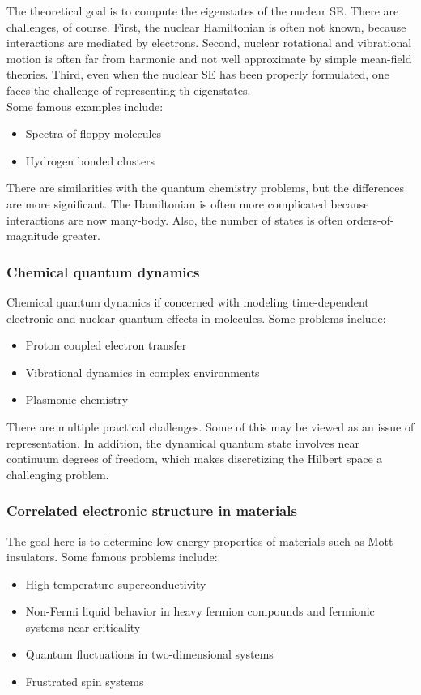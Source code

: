 \documentclass{book}
\theoremstyle{definition}
\begin{document}
The theoretical goal is to compute the eigenstates of the nuclear SE. There are challenges, of course. First, the nuclear Hamiltonian is often not known, because interactions are mediated by electrons. Second, nuclear rotational and vibrational motion is often far from harmonic and not well approximate by simple mean-field theories. Third, even when the nuclear SE has been properly formulated, one faces the challenge of representing th eigenstates. \\

Some famous examples include:
\begin{itemize}
	\item Spectra of floppy molecules
	\item Hydrogen bonded clusters
\end{itemize}

There are similarities with the quantum chemistry problems, but the differences are more significant. The Hamiltonian is often more complicated because interactions are now many-body. Also, the number of states is often orders-of-magnitude greater. 


\subsubsection{Chemical quantum dynamics}

Chemical quantum dynamics if concerned with modeling time-dependent electronic and nuclear quantum effects in molecules. Some problems include:
\begin{itemize}
	\item Proton coupled electron transfer
	\item Vibrational dynamics in complex environments
	\item Plasmonic chemistry
\end{itemize}


There are multiple practical challenges. Some of this may be viewed as an issue of representation. In addition, the dynamical quantum state involves near continuum degrees of freedom, which makes discretizing the Hilbert space a challenging problem. 


\subsubsection{Correlated electronic structure in materials}

The goal here is to determine low-energy properties of materials such as Mott insulators. Some famous problems include:
\begin{itemize}
	\item High-temperature superconductivity
	\item Non-Fermi liquid behavior in heavy fermion compounds and fermionic systems near criticality
	\item Quantum fluctuations in two-dimensional systems
	\item Frustrated spin systems
\end{itemize}
\end{document}
